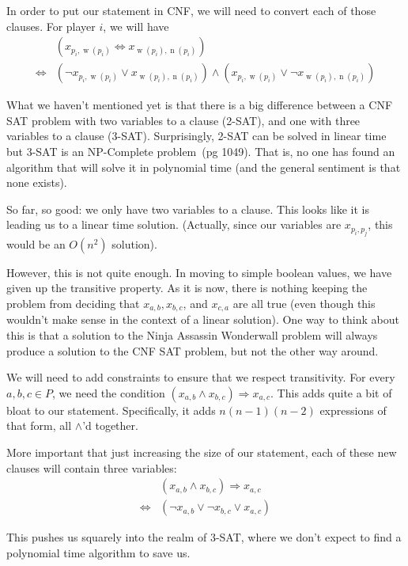 \documentclass[12pt]{article}
\DeclareMathOperator{\w}{w}
\DeclareMathOperator{\n}{n}
\begin{document}
    In order to put our statement in CNF, we will need to convert each of those clauses. For player $i$, we will have 
        \begin{align*}
            & (x_{p_i, \w(p_i)} \Leftrightarrow x_{\w(p_i), \n(p_i)})\\
            \Leftrightarrow & (\lnot x_{p_i, \w(p_i)} \vee x_{\w(p_i), \n(p_i)}) \wedge (x_{p_i, \w(p_i)} \vee \lnot x_{\w(p_i), \n(p_i)})
        \end{align*}

    What we haven't mentioned yet is that there is a big difference between a CNF SAT problem with two variables to a clause (2-SAT), and one with three variables to a clause (3-SAT). Surprisingly, 2-SAT can be solved in linear time but 3-SAT is an NP-Complete problem~\cite{clrs}(pg 1049). That is, no one has found an algorithm that will solve it in polynomial time (and the general sentiment is that none exists).

    So far, so good: we only have two variables to a clause. This looks like it is leading us to a linear time solution. (Actually, since our variables are $x_{p_i, p_j}$, this would be an $O(n^2)$ solution). 

    However, this is not quite enough. In moving to simple boolean values, we have given up the transitive property. As it is now, there is nothing keeping the problem from deciding that $x_{a,b}, x_{b,c}$, and $x_{c,a}$ are all true (even though this wouldn't make sense in the context of a linear solution). One way to think about this is that a solution to the Ninja Assassin Wonderwall problem will always produce a solution to the CNF SAT problem, but not the other way around.

    We will need to add constraints to ensure that we respect transitivity. For every $a,b,c \in P$, we need the condition $(x_{a,b} \wedge x_{b,c}) \Rightarrow x_{a,c}$. This adds quite a bit of bloat to our statement. Specifically, it adds $n(n-1)(n-2)$ expressions of that form, all $\wedge$'d together.

    More important that just increasing the size of our statement, each of these new clauses will contain three variables:
    \begin{align*}
        &(x_{a,b} \wedge x_{b,c}) \Rightarrow x_{a,c} \\
        \Leftrightarrow & (\lnot x_{a,b} \vee \lnot x_{b,c} \vee x_{a,c})
    \end{align*}

    This pushes us squarely into the realm of 3-SAT, where we don't expect to find a polynomial time algorithm to save us. 
\end{document}
